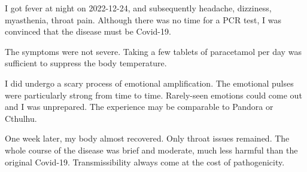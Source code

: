 
\begin{multicols*}{2}
	I got fever at night on 2022-12-24, and subsequently headache, dizziness, myasthenia, throat pain.
	Although there was no time for a PCR test, I was convinced that the disease must be Covid-19.

    The symptoms were not severe. Taking a few tablets of paracetamol per day was sufficient to suppress the body temperature.

    I did undergo a scary process of emotional amplification.
    The emotional pulses were particularly strong from time to time.
    Rarely-seen emotions could come out and I was unprepared.
    The experience may be comparable to Pandora or Cthulhu.

    One week later, my body almost recovered. Only throat issues remained.
    The whole course of the disease was brief and moderate, much less harmful than the original Covid-19.
    Transmissibility always come at the cost of pathogenicity.
\end{multicols*}
